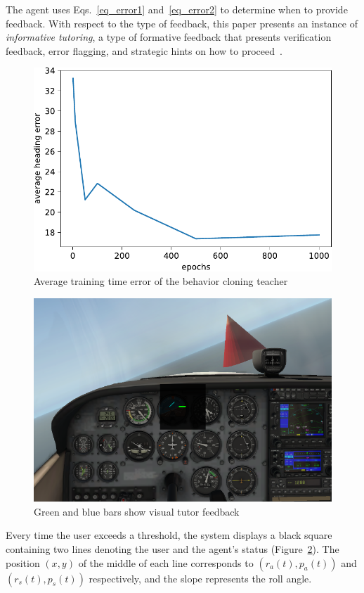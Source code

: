 \documentclass[letterpaper]{article} %
\begin{document}
The agent uses Eqs.~\ref{eq_error1} and~\ref{eq_error2} to determine when to provide feedback. With respect to the type of feedback, this paper presents an instance of \emph{informative tutoring}, a type of formative feedback that presents verification feedback, error flagging, and strategic hints on how to proceed~\citep{shute:08}.
\begin{figure}[t]
	\begin{minipage}{1\linewidth}
		\centering \small
		\includegraphics[width=\textwidth]{img/evaluation.pdf}
		\caption{Average training time error of the behavior cloning teacher}
		\label{fig:evaluate}
	\end{minipage}
\end{figure}
\begin{figure}[t]
	\begin{minipage}{1\linewidth}
		\centering \small
		\includegraphics[width=\textwidth]{img/feedback.pdf}
		\caption{Green and blue bars show visual tutor feedback}
		\label{fig:feedback}
	\end{minipage}
\end{figure}
Every time the user exceeds a threshold, the system displays a black square containing two lines denoting the user and the agent's status (Figure~\ref{fig:feedback}). The position $(x,y)$ of the middle of each line corresponds to $(r_a(t), p_a(t))$ and $(r_s(t), p_s(t))$ respectively, and the slope represents the roll angle.
\end{document}
